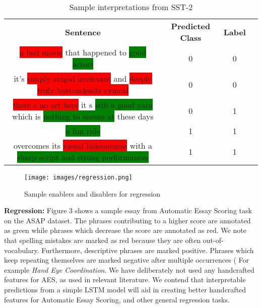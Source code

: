 \documentclass[11pt]{article}
\begin{document}
\begin{center}
  \begin{table*}[h]
  \renewcommand*{\arraystretch}{1.4}
\centering
\begin{tabular}{c c c c}
\hline
\textbf{Sentence} & \textbf{Predicted Class} & \textbf{Label}  \\
\noalign{\smallskip}
\hline

\colorbox{red}{a bad movie} that happened to \colorbox{green}{good actors} & 0 & 0 \\
it's \colorbox{red}{simply stupid irrelevant} and \colorbox{red}{deeply truly bottomlessly cynical} & 0 & 0 \\
\colorbox{red}{there s no art here} it s \colorbox{green}{still a good yarn }which is \colorbox{green}{nothing to sneeze at} these days & 0 & 1 \\
 \colorbox{green}{a fun ride} & 1 & 1 \\
 overcomes its \colorbox{red}{visual hideousness} with a \colorbox{green}{sharp script and strong performances} & 1 & 1 \\


\hline
\end{tabular}
\caption{Sample interpretations from SST-2}
\label{tab:dataset}     
\end{table*}
\end{center}


\begin{figure}
	\centering
	\texttt{[image: images/regression.png]}
	\caption{Sample enablers and disablers for regression}
	\label{fig:flowchart}
\end{figure}



\noindent \textbf{Regression: }  Figure 3 shows a sample essay from Automatic Essay Scoring task on the ASAP dataset. The phrases contributing to a higher score are annotated as green while phrases which decrease the score are annotated as red. We note that spelling mistakes are marked as red because they are often out-of-vocabulary. Furthermore, descriptive phrases are marked positive. Phrases which keep repeating themselves are marked negative after multiple occurrences ( For example \textit{Hand Eye Coordination}. We have deliberately not used any handcrafted features for AES, as used in relevant literature. We contend that interpretable predictions from a simple LSTM model will aid in creating better handcrafted features for Automatic Essay Scoring, and other general regression tasks.
\end{document}
